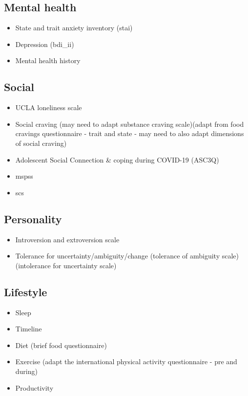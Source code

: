 \documentclass[]{book}
\providecommand{\tightlist}{%
  \setlength{\itemsep}{0pt}\setlength{\parskip}{0pt}}
\begin{document}
\hypertarget{mental-health}{%
\subsection{Mental health}\label{mental-health}}

\begin{itemize}
\tightlist
\item
  State and trait anxiety inventory (stai)
\item
  Depression (bdi\_ii)
\item
  Mental health history
\end{itemize}

\hypertarget{social}{%
\subsection{Social}\label{social}}

\begin{itemize}
\tightlist
\item
  UCLA loneliness scale
\item
  Social craving (may need to adapt substance craving scale)(adapt from food cravings questionnaire - trait and state - may need to also adapt dimensions of social craving)
\item
  Adolescent Social Connection \& coping during COVID-19 (ASC3Q)
\item
  mspss
\item
  scs
\end{itemize}

\hypertarget{personality}{%
\subsection{Personality}\label{personality}}

\begin{itemize}
\tightlist
\item
  Introversion and extroversion scale
\item
  Tolerance for uncertainty/ambiguity/change (tolerance of ambiguity scale)(intolerance for uncertainty scale)
\end{itemize}

\hypertarget{lifestyle}{%
\subsection{Lifestyle}\label{lifestyle}}

\begin{itemize}
\tightlist
\item
  Sleep
\item
  Timeline
\item
  Diet (brief food questionnaire)
\item
  Exercise (adapt the international physical activity questionnaire - pre and during)
\item
  Productivity
\end{itemize}
\end{document}
